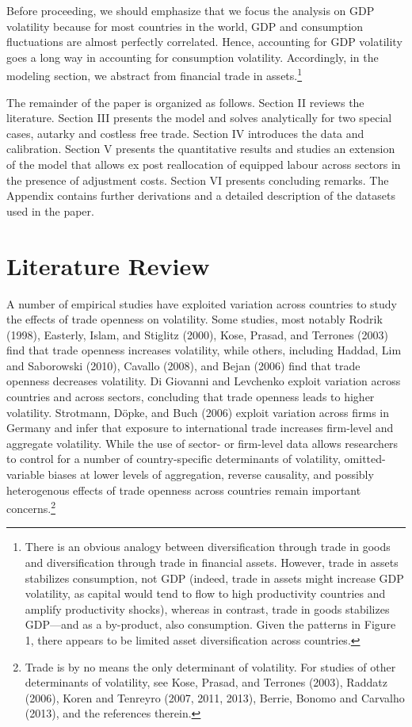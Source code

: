 \documentclass[12pt]{article}
\begin{document}
Before proceeding, we should emphasize that we focus the analysis on GDP
volatility because for most countries in the world, GDP and consumption
fluctuations are almost perfectly correlated. Hence, accounting for GDP
volatility goes a long way in accounting for consumption volatility.
Accordingly, in the modeling section, we abstract from financial trade in
assets.\footnote{%
There is an obvious analogy between diversification through trade in goods
and diversification through trade in financial assets. However, trade in
assets stabilizes consumption, not GDP (indeed, trade in assets might
increase GDP volatility, as capital would tend to flow to high productivity
countries and amplify productivity shocks), whereas in contrast, trade in
goods stabilizes GDP---and as a by-product, also consumption. Given the
patterns in Figure 1, there appears to be limited asset diversification
across countries.}

The remainder of the paper is organized as follows. Section II reviews the
literature. Section III presents the model and solves analytically for two
special cases, autarky and costless free trade. Section IV introduces the
data and calibration. Section V presents the quantitative results and
studies an extension of the model that allows ex post reallocation of
equipped labour across sectors in the presence of adjustment costs. Section
VI presents concluding remarks. The Appendix contains further derivations
and a detailed description of the datasets used in the paper.

\section{Literature Review}

A number of empirical studies have exploited variation across countries to
study the effects of trade openness on volatility. Some studies, most
notably Rodrik (1998), Easterly, Islam, and Stiglitz (2000), Kose, Prasad,
and Terrones (2003) find that trade openness increases volatility, while
others, including Haddad, Lim and Saborowski (2010), Cavallo (2008), and
Bejan (2006) find that trade openness decreases volatility. Di Giovanni and
Levchenko exploit variation across countries and across sectors, concluding
that trade openness leads to higher volatility. Strotmann, D\"{o}pke, and
Buch (2006) exploit variation across firms in Germany and infer that
exposure to international trade increases firm-level and aggregate
volatility. While the use of sector- or firm-level data allows researchers
to control for a number of country-specific determinants of volatility,
omitted-variable biases at lower levels of aggregation, reverse causality,
and possibly heterogenous effects of trade openness across countries remain
important concerns.\footnote{%
Trade is by no means the only determinant of volatility. For studies of
other determinants of volatility, see Kose, Prasad, and Terrones (2003),
Raddatz (2006), Koren and Tenreyro (2007, 2011, 2013), Berrie, Bonomo and
Carvalho (2013), and the references therein.}
\end{document}
